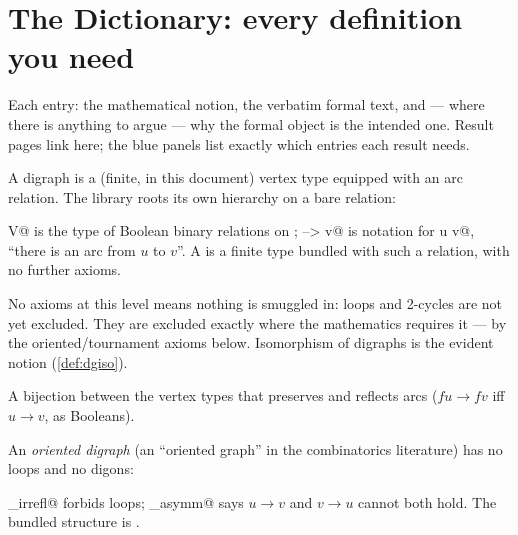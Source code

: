 \chapter{The Dictionary: every definition you need}
\label{ch:dictionary}

Each entry: the mathematical notion, the verbatim formal text, and ---
where there is anything to argue --- why the formal object is the
intended one. Result pages link here; the blue panels list exactly
which entries each result needs.


A digraph is a (finite, in this document) vertex type equipped with an
arc relation. The library roots its own hierarchy on a bare relation:



\noindent
\rocqinline@rel V@ is the type of Boolean binary relations on
\rocqinline@V@; \rocqinline@u --> v@ is notation for
\rocqinline@arc u v@, ``there is an arc from $u$ to $v$''.
A \rocqinline@diGraphType@ is a finite type bundled with such a
relation, with no further axioms.

\begin{faithnote}
No axioms at this level means nothing is smuggled in: loops and
2-cycles are not yet excluded. They are excluded exactly where the
mathematics requires it --- by the oriented/tournament axioms below.
Isomorphism of digraphs is the evident notion (\cref{def:dgiso}).
\end{faithnote}




\noindent A bijection between the vertex types that preserves and
reflects arcs ($f u \to f v$ iff $u \to v$, as Booleans).


An \emph{oriented digraph} (an ``oriented graph'' in the combinatorics
literature) has no loops and no digons:



\noindent
\rocqinline@arc_irrefl@ forbids loops; \rocqinline@arc_asymm@ says
$u \to v$ and $v \to u$ cannot both hold. The bundled structure is
\rocqinline@orientedDigraph@.




